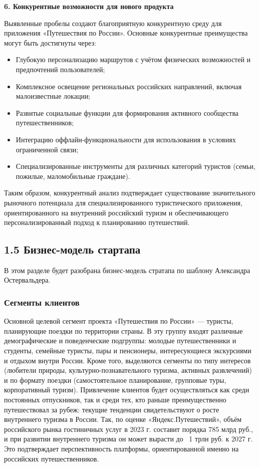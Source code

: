 \textbf{6. Конкурентные возможности для нового продукта}

Выявленные пробелы создают благоприятную конкурентную среду для приложения «Путешествия по России». Основные конкурентные преимущества могут быть достигнуты через:
\begin{itemize}
    \item Глубокую персонализацию маршрутов с учётом физических возможностей и предпочтений пользователей;
    \item Комплексное освещение региональных российских направлений, включая малоизвестные локации;
    \item Развитые социальные функции для формирования активного сообщества путешественников;
    \item Интеграцию оффлайн-функциональности для использования в условиях ограниченной связи;
    \item Специализированные инструменты для различных категорий туристов (семьи, пожилые, маломобильные граждане).
\end{itemize}

Таким образом, конкурентный анализ подтверждает существование значительного рыночного потенциала для специализированного туристического приложения, ориентированного на внутренний российский туризм и обеспечивающего персонализированный подход к планированию путешествий.

\subsection*{1.5 Бизнес-модель стартапа}
В этом разделе будет разобрана бизнес-модель стратапа по шаблону Александра Остервальдера.

\subsubsection*{Сегменты клиентов}
Основной целевой сегмент проекта «Путешествия по России» — туристы, планирующие поездки по территории страны. В эту группу входят различные демографические и поведенческие подгруппы: молодые путешественники и студенты, семейные туристы, пары и пенсионеры, интересующиеся экскурсиями и отдыхом внутри России. Кроме того, выделяются сегменты по типу интересов (любители природы, культурно-познавательного туризма, активных развлечений) и по формату поездки (самостоятельное планирование, групповые туры, корпоративный туризм). Привлечение клиентов будет осуществляться как среди постоянных отпускников, так и среди тех, кто раньше преимущественно путешествовал за рубеж: текущие тенденции свидетельствуют о росте внутреннего туризма в России. Так, по оценке «Яндекс.Путешествий», объём российского рынка гостиничных услуг в 2023 г. составит порядка 785 млрд руб., и при развитии внутреннего туризма он может вырасти до ~1 трлн руб. к 2027 г. Это подтверждает перспективность платформы, ориентированной именно на российских путешественников.

